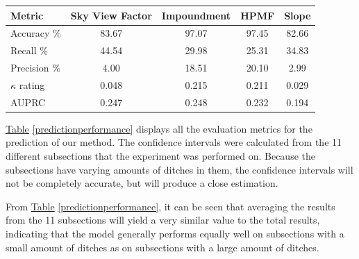 \documentclass[]{interact}
\theoremstyle{plain}%
\theoremstyle{definition}
\theoremstyle{remark}
\begin{document}
\begin{table}[!htb]
    {\begin{tabular}{lcccc} \toprule
        Metric & Sky View Factor & Impoundment & HPMF & Slope\\ \midrule
        Accuracy \%     & 83.67 & 97.07 & 97.45 & 82.66 \\
        Recall \%       & 44.54 & 29.98 & 25.31 & 34.83 \\
        Precision \%    &{ 4.00}  & 18.51 & 20.10 & { 2.99} \\
        $\kappa$ rating & 0.048 & 0.215 & 0.211 & 0.029 \\
        AUPRC & 0.247 & 0.248 & 0.232 & 0.194 \\ \bottomrule
    \end{tabular}}
    \label{recreatedpredictionperformance}
\end{table}

\hyperref[predictionperformance]{Table} \ref{predictionperformance} displays all the evaluation metrics for the prediction of our method. The confidence intervals were calculated from the 11 different subsections that the experiment was performed on. Because the subsections have varying amounts of ditches in them, the confidence intervals will not be completely accurate, but will produce a close estimation.

From \hyperref[predictionperformance]{Table} \ref{predictionperformance}, it can be seen that averaging the results from the 11 subsections will yield a very similar value to the total results, indicating that the model generally performs equally well on subsections with a small amount of ditches as on subsections with a large amount of ditches.
\end{document}
